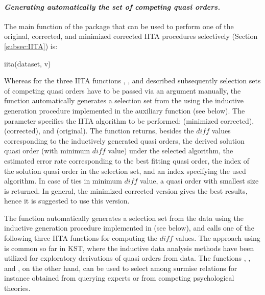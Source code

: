 \documentclass[nojss]{jss}
\begin{document}
\paragraph{\it Generating automatically the set of competing quasi orders.}
The main function of the package  that can be used to perform one of the original, 
corrected, and minimized corrected IITA procedures selectively (Section \ref{subsec:IITA}) is: 
\begin{Code}
iita(dataset, v)
\end{Code}
Whereas for the three IITA functions , , and 
described subsequently selection sets of competing quasi orders have to be passed via an argument
manually, the function  automatically generates a selection set from the  using the inductive generation procedure implemented in the auxiliary function 
 (see below). The parameter  specifies the IITA algorithm to be performed:  (minimized corrected),  (corrected), and  (original). 
The function  returns, besides the $\mathit{diff}$ values corresponding to the inductively
generated quasi orders, the derived solution quasi order (with minimum $\mathit{diff}$ value) under the selected algorithm, the estimated error rate corresponding to the best fitting quasi order, the index of the solution quasi order in the selection set, and an index specifying the used algorithm. 
In case of ties in minimum $\mathit{diff}$ value, a quasi order with smallest size is returned. 
In general, the minimized corrected version gives the best results, hence it is suggested to use 
this version.

The function  automatically generates a selection set from the data 
using the inductive generation procedure implemented in  (see below), and calls 
one of the following three IITA functions for computing the $\mathit{diff}$ values. The approach 
using  is common so far in KST, where the inductive data analysis methods have 
been utilized for exploratory derivations of quasi orders from data. The functions 
, , and , on the other hand, can be used to select 
among surmise relations for instance obtained from querying experts or from competing
psychological theories.
\end{document}

